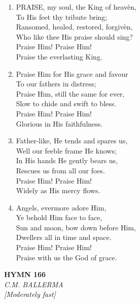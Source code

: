 \documentclass[11pt,a4paper]{article}
\begin{document}
\begin{enumerate}
    \item PRAISE, my soul, the King of heav\`en, \\
        To His feet thy tribute bring; \\
        Ransomed, healed, restored, forgiv\`en, \\
        Who like thee His praise should sing? \\
        Praise Him! Praise Him! \\
        Praise the everlasting King.

    \item Praise Him for His grace and favour \\
        To our fathers in distress; \\
        Praise Him, still the same for ever, \\
        Slow to chide and swift to bless. \\
        Praise Him! Praise Him! \\
        Glorious in His faithfulness.

    \item Father-like, He tends and spares us, \\
        Well our feeble frame He knows; \\
        In His hands He gently bears us, \\
        Rescues us from all our foes. \\
        Praise Him! Praise Him! \\
        Widely as His mercy flows.

    \item Angels, evermore adore Him, \\
        Ye behold Him face to face, \\
        Sun and moon, bow down before Him, \\
        Dwellers all in time and space. \\
        Praise Him! Praise Him! \\
        Praise with us the God of grace.

\end{enumerate}

\newpage
\begin{center}
    {\Large \textbf{HYMN 166}}
    \\
    \textit{C.M. BALLERMA}
    \\
    \textit{\small [Moderately fast]}
\end{center}
\vspace{1em}
\end{document}
